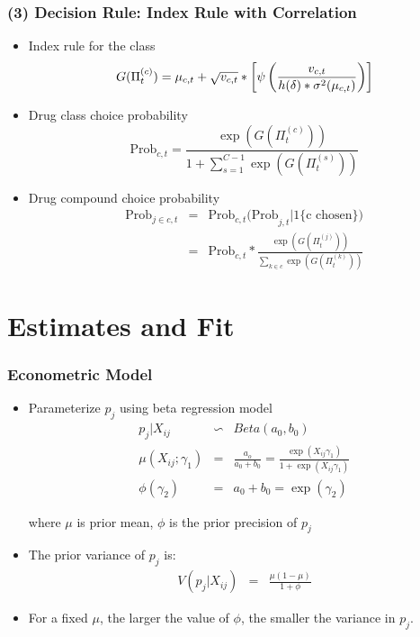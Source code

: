 \documentclass[xcolor=pdftex,dvipsnames,table,mathserif,aspectratio=169]{beamer}
\begin{document}

\begin{frame}
\frametitle{(3) Decision Rule: Index Rule with Correlation}

\begin{itemize}
\item Index rule for the class 
\[
G(\Pi _{t}^{(c)})=\mu _{c,t}+\sqrt{v_{c,t}}*\left[\psi \left( \frac{v_{c,t}}{%
h(\delta)\ast \sigma ^{2}(\mu _{c,t})}\right)\right]
\]

\item Drug class choice probability 
\[
\text{Prob}_{c,t}=\frac{\exp (G(\Pi _{t}^{(c)}))}{1+\sum_{s=1}^{C-1}\exp
(G(\Pi _{t}^{(s)}))}
\]

\item Drug compound choice probability 
\begin{eqnarray*}
\text{Prob}_{j\in c,t} &=&\text{Prob}_{c,t}\text{(Prob}_{j,t}|\text{1\{c
chosen\})} \\
&=&\text{Prob}_{c,t}\ast \frac{\exp (G(\Pi _{t}^{(j)}))}{\sum_{k\in c}\exp
(G(\Pi _{t}^{(k)}))}
\end{eqnarray*}
\end{itemize}
\end{frame}

\section{Estimates and Fit}


\begin{frame}
\frametitle{Econometric Model}

\begin{itemize}
\item Parameterize $p_{j}$ using beta regression model 
\begin{eqnarray*}  \label{mu_logit}
p_{j}|X_{ij} &\backsim &Beta(a_{0},b_{0}) \\
\mu(X_{ij};\gamma_{1}) &=& \frac{a_{o}}{a_{0}+b_{0}} = \frac{\exp
(X_{ij}\gamma_{1} )}{1+\exp(X_{ij}\gamma_{1} )} \\
\phi(\gamma_{2}) &=& a_{0}+b_{0}=\exp(\gamma_{2})
\end{eqnarray*}

where $\mu$ is prior mean, $\phi$ is the prior precision of $p_{j}$

\item The prior variance of $p_{j}$ is: 
\begin{eqnarray*}
V(p_{j}|X_{ij})&=&\frac{\mu(1-\mu)}{1+\phi}
\end{eqnarray*}

\item For a fixed $\mu$, the larger the value of $\phi$, the smaller the
variance in $p_{j}$.
\end{itemize}
\end{frame}
\end{document}
